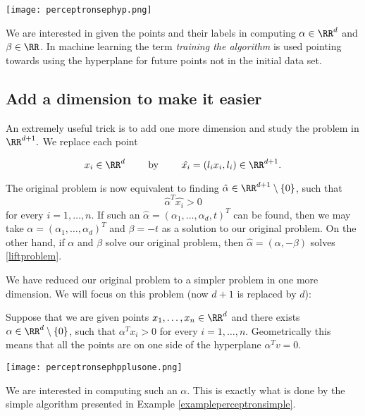 \documentclass{article}
\begin{document}
\texttt{[image: perceptronsephyp.png]}


We are interested in given the points and their labels in
computing $\alpha\in \RR^d$ and $\beta\in \RR$. In machine learning
the term \emph{training the algorithm} is used pointing
towards using the hyperplane for future points not in
the initial data set.


\subsection{Add a dimension to make it easier}

An extremely useful trick is to add one more dimension
and study the problem in $\RR^{d+1}.$ We replace
each point

$$
x_i\in \RR^d\qquad\text{ by }\qquad \hat{x_i} = (l_i x_i, l_i)\in \RR^{d+1}.
$$

The original problem is now equivalent to finding $\hat{\alpha}\in \RR^{d+1}\setminus\{0\}$,
such that
\begin{equation}\label{liftproblem}
\hat{\alpha}^T \hat{x_i} > 0
\end{equation}
for every $i = 1, \dots, n$. If such an $\hat{\alpha} = (\alpha_1, \dots, \alpha_d, t)^T$ can
be found, then we may take $\alpha = (\alpha_1, \dots, \alpha_d)^T$ and $\beta = -t$ as
a solution to our original problem.
On the other hand, if $\alpha$ and $\beta$ solve our original problem, then
$\hat{\alpha} = (\alpha, -\beta)$ solves \eqref{liftproblem}.


We have reduced our original problem to a simpler problem in
one more dimension. We will focus on this problem (now $d+1$ is
replaced by $d$):

Suppose that we are given points $x_1, \dots, x_n\in \RR^d$ and
there exists $\alpha\in \RR^d\setminus \{0\}$, such that
$\alpha^T x_i > 0$ for every $i = 1, \dots, n$. Geometrically
this means that all the points are on one side of the
hyperplane $\alpha^T v = 0$.

\texttt{[image: perceptronsephpplusone.png]}


We are interested in computing such an $\alpha$. This is exactly
what is done by the simple
algorithm presented in Example \ref{exampleperceptronsimple}.
\end{document}
